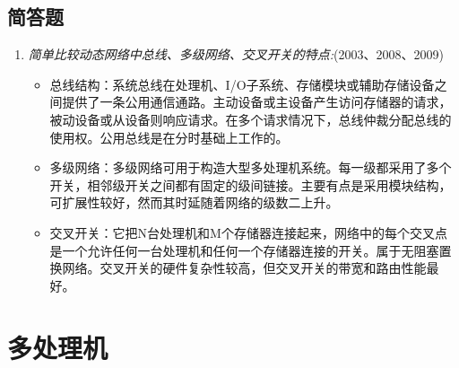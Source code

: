\documentclass[a4paper]{ctexart}
\begin{document}
\subsection{简答题}
\begin{enumerate}
  \item \emph{简单比较动态网络中总线、多级网络、交叉开关的特点:}(2003、2008、2009)
  \begin{itemize}
    \item 总线结构：系统总线在处理机、I/O子系统、存储模块或辅助存储设备之间提供了一条公用通信通路。主动设备或主设备产生访问存储器的请求，被动设备或从设备则响应请求。在多个请求情况下，总线仲裁分配总线的使用权。公用总线是在分时基础上工作的。
    \item 多级网络：多级网络可用于构造大型多处理机系统。每一级都采用了多个开关，相邻级开关之间都有固定的级间链接。主要有点是采用模块结构，可扩展性较好，然而其时延随着网络的级数二上升。
    \item 交叉开关：它把N台处理机和M个存储器连接起来，网络中的每个交叉点是一个允许任何一台处理机和任何一个存储器连接的开关。属于无阻塞置换网络。交叉开关的硬件复杂性较高，但交叉开关的带宽和路由性能最好。
  \end{itemize}
  
\end{enumerate}

\newpage
\section{多处理机}
\end{document}
